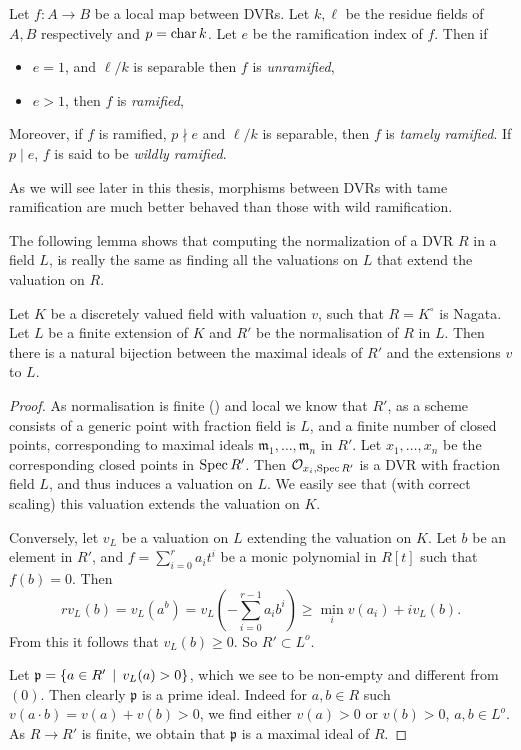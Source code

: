 \begin{definition}
	Let $f: A \to B$ be a local map between DVRs. 
	Let $k, \ell$ be the residue fields of $A, B$ respectively and $p = \operatorname{char} k$.
	Let $e$ be the ramification index of $f$.
	Then if
	\begin{itemize}
		\item $e = 1$, and $\ell / k$ is separable then $f$ is \emph{unramified}, 
		\item $e > 1$, then $f$ is \emph{ramified},
	\end{itemize}
	Moreover, if $f$ is ramified, $p \nmid e$ and $\ell / k$ is separable, then $f$ is \emph{tamely ramified}. 
	If $p \mid e$, $f$ is said to be \emph{wildly ramified}. 
\end{definition}
As we will see later in this thesis, morphisms between DVRs with tame ramification are much better behaved than those with wild ramification. 


The following lemma shows that computing the normalization of a DVR $R$ in a field $L$, is really the same as finding all the valuations on $L$ that extend the valuation on $R$. 
\begin{lemma}\label{lem:normalisation_extension_norm}
	Let $K$ be a discretely valued field with valuation $v$, such that $R = K^{\circ}$ is Nagata. 
	Let $L$ be a finite extension of $K$ and $R'$ be the normalisation of $R$ in $L$. 
	Then there is a natural bijection between the maximal ideals of $R'$ and the extensions $v $ to $L$. 
\end{lemma}
\begin{proof}
	As normalisation is finite () and local we know that $R'$, as a scheme consists of a generic point with fraction field is $L$, and a finite number of closed points, corresponding to maximal ideals $\mathfrak{m}_1, \ldots, \mathfrak{m} _n $ in $R'$. 
	Let $x_1, \ldots, x_n$ be the corresponding closed points in $\operatorname{Spec} R'$. 
	Then $\mathcal{O}_{x_i, \operatorname{Spec} R'}$ is a DVR with fraction field $L$, and thus induces a valuation on $L$. 
	We easily see that (with correct scaling) this valuation extends the valuation on $K$. 

	Conversely, let $v_L$ be a valuation on $L$ extending the valuation on $K$. 
	Let $b$ be an element in $R'$, and $f = \sum_{i = 0}^{r} a_i t^{i}$ be a monic polynomial in $R[t]$ such that $f(b) = 0$. 
	Then \[
		rv_L(b) = v_L(a^{b}) = v_L \left(-\sum_{i = 0}^{r-1} a_i b^{i}\right) \ge \min_{i} v(a_i) + iv_L(b)
	.\] 
	From this it follows that $v_L(b) \ge 0$. 
	So $R' \subset L^{o}$.  

	Let $\mathfrak{p}  = \{a \in R' \st v_L(a) > 0\} $, which we see to be non-empty and different from $(0)$. 
	Then clearly $\mathfrak{p} $ is a prime ideal.
	Indeed for $a, b \in R$  such $v(a \cdot b) = v(a) + v(b) > 0$, we find either $v(a) > 0$ or $v(b) > 0$, $a, b \in L^{o}$. 
	As $R \to R'$ is finite, we obtain that $\mathfrak{p} $ is a maximal ideal of $R$. 
\end{proof}

